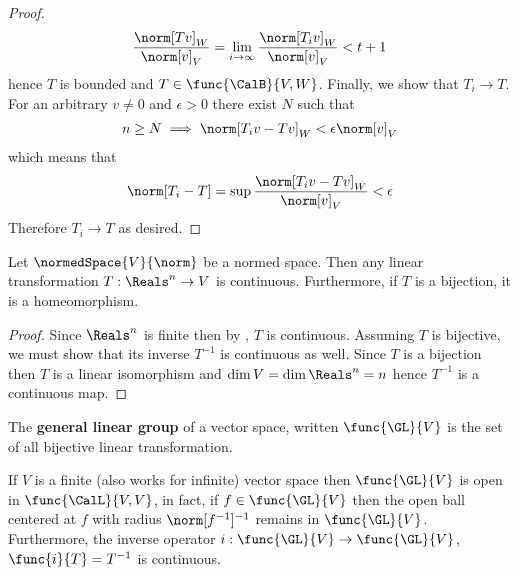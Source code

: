 \begin{proof}
    \begin{equation*}
        \dfrac{\norm[Tv]_W}{\norm[v]_V} = \lim_{i \to \infty}  \dfrac{\norm[T_i v]_W}{\norm[v]_V} < t + 1
    \end{equation*}
    hence \(T\) is bounded and \(T \in \func{\CalB}{V,W}\). Finally, we show that \(T_i \to T\). For an arbitrary \(v \neq 0\) and \(\epsilon > 0\) there exist \(N\) such that
    \begin{align*}
        n \geq N \implies \norm[T_i v - Tv]_W < \epsilon \norm[v]_V
    \end{align*}
    which means that
    \begin{equation*}
        \norm[T_i - T] = \sup \dfrac{\norm[T_i v - Tv]_W}{\norm[v]_V} < \epsilon
    \end{equation*}
    Therefore \(T_i \to T\) as desired.
\end{proof}

\begin{theorem}
    Let \(\normedSpace{V}{\norm}\) be a normed space. Then any linear transformation \(T: \Reals^n \to V\) is continuous. Furthermore, if \(T\) is a bijection, it is a homeomorphism.
\end{theorem}

\begin{proof}
    Since \(\Reals^n\) is finite then by , \(T\) is continuous. Assuming \(T\) is bijective, we must show that its inverse \(T^{-1}\) is continuous as well. Since \(T\) is a bijection then \(T\) is a linear isomorphism and \(\dim V = \dim \Reals^n = n\) hence \(T^{-1}\) is a continuous map.
\end{proof}

\begin{definition}
    The \textbf{general linear group} of a vector space, written \(\func{\GL}{V}\) is the set of all bijective linear transformation.
\end{definition}

\begin{proposition}
    If \(V\) is a finite (also works for infinite) vector space then \(\func{\GL}{V}\) is open in \(\func{\CalL}{V,V}\), in fact, if \(f \in \func{\GL}{V}\) then the open ball centered at \(f\) with radius \(\norm[f^{-1}]^{-1}\) remains in \(\func{\GL}{V}\). Furthermore, the inverse operator \(i : \func{\GL}{V} \to \func{\GL}{V}\), \(\func{i}{T} = T^{-1}\) is continuous.
\end{proposition}

